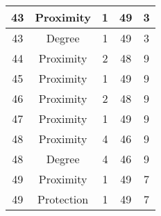 \documentclass[results.tex]{subfiles}
\begin{document}
\begin{center}
\begin{tabular}{| c || c | c | c | c |}
            \hline
            43                      & Proximity                    & 1                      & 49                      & 3                    \\
            \hline
            43                      & Degree                       & 1                      & 49                      & 3                    \\
            \hline
            44                      & Proximity                    & 2                      & 48                      & 9                    \\
            \hline
            45                      & Proximity                    & 1                      & 49                      & 9                    \\
            \hline
            46                      & Proximity                    & 2                      & 48                      & 9                    \\
            \hline
            47                      & Proximity                    & 1                      & 49                      & 9                    \\
            \hline
            48                      & Proximity                    & 4                      & 46                      & 9                    \\
            \hline
            48                      & Degree                       & 4                      & 46                      & 9                    \\
            \hline
            49                      & Proximity                    & 1                      & 49                      & 7                    \\
            \hline
            49                      & Protection                   & 1                      & 49                      & 7                    \\
            \hline
        \end{tabular}
    \end{center}
\end{document}

